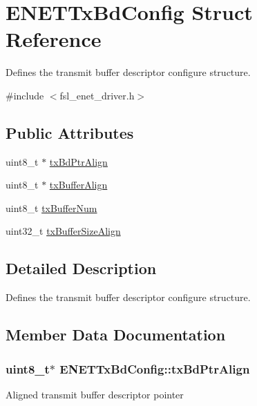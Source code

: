 \hypertarget{structENETTxBdConfig}{}\section{E\+N\+E\+T\+Tx\+Bd\+Config Struct Reference}
\label{structENETTxBdConfig}


Defines the transmit buffer descriptor configure structure.  




{\ttfamily \#include $<$fsl\+\_\+enet\+\_\+driver.\+h$>$}

\subsection*{Public Attributes}
\begin{DoxyCompactItemize}
\item 
uint8\+\_\+t $\ast$ \hyperlink{structENETTxBdConfig_a555efc605025af618926778b5ce4c6a0}{tx\+Bd\+Ptr\+Align}
\item 
uint8\+\_\+t $\ast$ \hyperlink{structENETTxBdConfig_aaeb96c5f5d549a2454f70541e9aaaddf}{tx\+Buffer\+Align}
\item 
uint8\+\_\+t \hyperlink{structENETTxBdConfig_ab68fc55998aa161c23c0973b2fd59b47}{tx\+Buffer\+Num}
\item 
uint32\+\_\+t \hyperlink{structENETTxBdConfig_ad4b826f478a979e698e902de9324683d}{tx\+Buffer\+Size\+Align}
\end{DoxyCompactItemize}


\subsection{Detailed Description}
Defines the transmit buffer descriptor configure structure. 

\subsection{Member Data Documentation}
\subsubsection[{\texorpdfstring{tx\+Bd\+Ptr\+Align}{txBdPtrAlign}}]{\setlength{\rightskip}{0pt plus 5cm}uint8\+\_\+t$\ast$ E\+N\+E\+T\+Tx\+Bd\+Config\+::tx\+Bd\+Ptr\+Align}\hypertarget{structENETTxBdConfig_a555efc605025af618926778b5ce4c6a0}{}\label{structENETTxBdConfig_a555efc605025af618926778b5ce4c6a0}
Aligned transmit buffer descriptor pointer 
